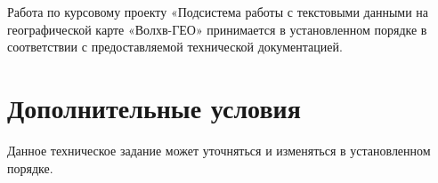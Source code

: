 \documentclass[russian,utf8,emptystyle]{eskdtext}
\makeatletter
\newcounter{pageaux}
\def\currentauxref{PAGEAUX1}
\newcommand{\resetpageaux}{%
  \clearpage
  \edef\@currentlabel{\thepageaux}\label{\currentauxref}%
  \xdef\currentauxref{PAGEAUX\thepage}%
  \setcounter{pageaux}{0}}
\makeatother
\begin{document}
Работа по курсовому проекту «Подсистема работы с текстовыми данными на географической карте «Волхв-ГЕО» принимается в установленном порядке в соответствии с предоставляемой технической документацией.

\section{Дополнительные условия}

Данное техническое задание может уточняться и изменяться в установленном порядке.

\resetpageaux
\end{document}
